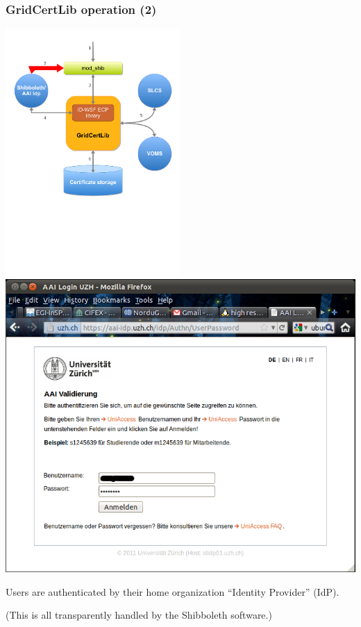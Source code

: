 \documentclass{beamer}
\newcommand{\+}{\vspace{1em}}
\begin{document}
\begin{frame}
  \frametitle{GridCertLib operation (2)}
  \begin{center}
    \includegraphics[width=0.5\textwidth,viewport=0 300 600 650]{architecture2}
    \includegraphics[height=0.50\textheight]{idp}

    \+ Users are authenticated by their home organization ``Identity
    Provider'' (IdP).

    \+ (This is all transparently handled by the Shibboleth software.)
  \end{center}
\end{frame}
\end{document}
